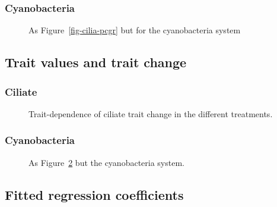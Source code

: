 \documentclass[
  letterpaper,
  DIV=11,
  numbers=noendperiod]{scrartcl}
\begin{document}
\subsubsection{Cyanobacteria}\label{cyanobacteria-1}

\begin{figure}


\caption{\label{fig-cyano-pcgr}As Figure~\ref{fig-cilia-pcgr} but for
the cyanobacteria system}

\end{figure}%

\subsection{Trait values and trait
change}\label{trait-values-and-trait-change}

\subsubsection{Ciliate}\label{ciliate-2}

\begin{figure}


\caption{\label{fig-cilia-dT}Trait-dependence of ciliate trait change in
the different treatments.}

\end{figure}%

\subsubsection{Cyanobacteria}\label{cyanobacteria-2}

\begin{figure}


\caption{\label{fig-cyano-dT}As Figure~\ref{fig-cilia-dT} but the
cyanobacteria system.}

\end{figure}%

\subsection{Fitted regression
coefficients}\label{fitted-regression-coefficients}
\end{document}

